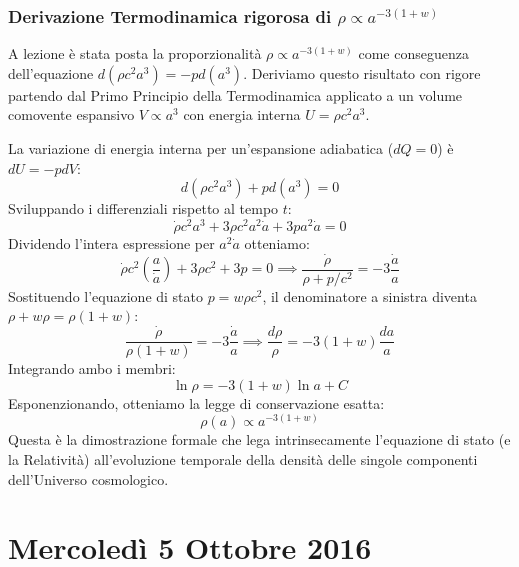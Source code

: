 \documentclass[11pt,a4paper]{report}
\begin{document}
\subsection{Derivazione Termodinamica rigorosa di $\rho \propto a^{-3(1+w)}$}
A lezione è stata posta la proporzionalità $\rho \propto a^{-3(1+w)}$ come conseguenza dell'equazione $d(\rho c^2 a^3) = -p d(a^3)$. Deriviamo questo risultato con rigore partendo dal Primo Principio della Termodinamica applicato a un volume comovente espansivo $V \propto a^3$ con energia interna $U = \rho c^2 a^3$.

La variazione di energia interna per un'espansione adiabatica ($dQ=0$) è $dU = -p dV$:
\begin{equation}
d(\rho c^2 a^3) + p d(a^3) = 0
\end{equation}
Sviluppando i differenziali rispetto al tempo $t$:
\begin{equation}
\dot{\rho}c^2 a^3 + 3\rho c^2 a^2 \dot{a} + 3p a^2\dot{a} = 0
\end{equation}
Dividendo l'intera espressione per $a^2 \dot{a}$ otteniamo:
\begin{equation}
\dot{\rho}c^2 \left(\frac{a}{\dot{a}}\right) + 3\rho c^2 + 3p = 0 \implies \frac{\dot{\rho}}{\rho + p/c^2} = -3\frac{\dot{a}}{a}
\end{equation}
Sostituendo l'equazione di stato $p = w \rho c^2$, il denominatore a sinistra diventa $\rho + w\rho = \rho(1+w)$:
\begin{equation}
\frac{\dot{\rho}}{\rho(1+w)} = -3\frac{\dot{a}}{a} \implies \frac{d\rho}{\rho} = -3(1+w)\frac{da}{a}
\end{equation}
Integrando ambo i membri:
\begin{equation}
\ln \rho = -3(1+w)\ln a + C
\end{equation}
Esponenzionando, otteniamo la legge di conservazione esatta:
\begin{equation}
\rho(a) \propto a^{-3(1+w)}
\end{equation}
Questa è la dimostrazione formale che lega intrinsecamente l'equazione di stato (e la Relatività) all'evoluzione temporale della densità delle singole componenti dell'Universo cosmologico.

\chapter{Mercoledì 5 Ottobre 2016}
\end{document}
